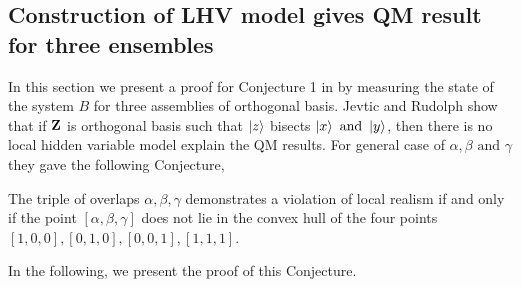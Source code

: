 \subsection{Construction of LHV model gives QM  result for three ensembles}\hfill \break
In this section we present a proof for Conjecture 1  in \citet*{Jevtic:2015:10.1364/JOSAB.32.000A50} by measuring the state of the system $B$ for three assemblies of orthogonal basis.
Jevtic and Rudolph  show that if $\bf{Z}$ is orthogonal basis such that $\ket{z}$ bisects $\ket{x} \text{ and } \ket{y}$, then there is no local hidden variable model explain the QM results. For general case of $\alpha, \beta \text{ and } \gamma $ they gave the following Conjecture,



\begin{theorem}
The triple of overlaps $\alpha,\beta, \gamma$ demonstrates a violation of local realism if and only if the point $[\alpha,\beta, \gamma]$ does not lie in the convex hull of the four points
$[1, 0, 0], [0, 1, 0], [0, 0, 1], [1, 1, 1]$.
\end{theorem}
In the following, we present the proof of this Conjecture.
